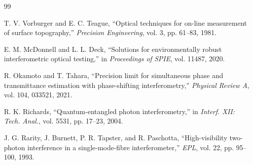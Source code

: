 \documentclass[11pt,a4paper]{article}
\begin{document}
\begin{thebibliography}{99}

T. V. Vorburger and E. C. Teague,
``Optical techniques for on-line measurement of surface topography,''
\emph{Precision Engineering}, vol. 3, pp. 61--83, 1981.

E. M. McDonnell and L. L. Deck,
``Solutions for environmentally robust interferometric optical testing,''
in \emph{Proceedings of SPIE}, vol. 11487, 2020.

R. Okamoto and T. Tahara,
``Precision limit for simultaneous phase and transmittance estimation with phase-shifting interferometry,''
\emph{Physical Review A}, vol. 104, 033521, 2021.

R. K. Richards,
``Quantum-entangled photon interferometry,''
in \emph{Interf. XII: Tech. Anal.}, vol. 5531, pp. 17--23, 2004.

J. G. Rarity, J. Burnett, P. R. Tapster, and R. Paschotta,
``High-visibility two-photon interference in a single-mode-fibre interferometer,''
\emph{EPL}, vol. 22, pp. 95--100, 1993.

\end{thebibliography}
\end{document}
